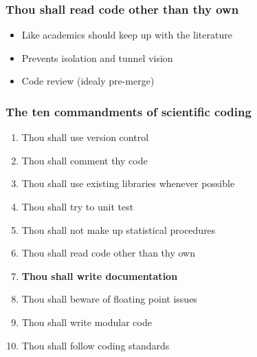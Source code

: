 \documentclass[slidestop]{beamer}
\begin{document}
\begin{frame}
  \frametitle{Thou shall read code other than thy own}
  \begin{itemize}
    \item Like academics should keep up with the literature
    \item Prevents isolation and tunnel vision
    \item Code review (idealy pre-merge)
  \end{itemize}
\end{frame}

{
  \frame{}
}

\begin{frame}
  \frametitle{The ten commandments of scientific coding}
  \begin{enumerate}
    \item Thou shall use version control
    \item Thou shall comment thy code
    \item Thou shall use existing libraries whenever possible
    \item Thou shall try to unit test
    \item Thou shall not make up statistical procedures
    \item Thou shall read code other than thy own
    \item {\bf Thou shall write documentation}
    \item Thou shall beware of floating point issues
    \item Thou shall write modular code
    \item Thou shall follow coding standards
  \end{enumerate}
\end{frame}
\end{document}
